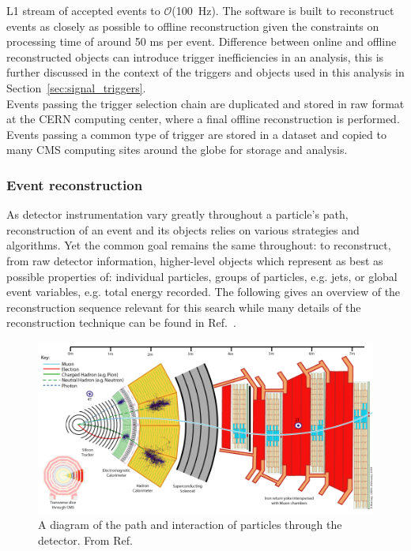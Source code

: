 L1 stream of accepted events to $\mathcal{O}$(100~Hz). The software is built to reconstruct
events as closely as possible to offline reconstruction given the constraints on processing time
of around 50 ms per event. Difference between online and offline reconstructed objects can 
introduce trigger inefficiencies in an analysis, this is further discussed in the 
context of the triggers and objects used in this analysis in Section~\ref{sec:signal_triggers}.\\
\indent Events passing the trigger selection chain are duplicated and stored in raw format at
the CERN computing center, where a final offline reconstruction is performed. Events passing
a common type of trigger are stored in a dataset and copied to many CMS computing sites around the
globe for storage and analysis. 
  
\subsubsection{Event reconstruction\label{sec:eventReco}}

As detector instrumentation vary greatly throughout a particle's path, reconstruction
of an event and its objects relies on various strategies and algorithms. Yet the common goal 
remains the same throughout: to reconstruct, from raw detector information,
higher-level objects which represent as best as possible properties of: individual
particles, groups of particles, e.g. jets, or global event variables, e.g. total energy
recorded. The following gives an overview of the reconstruction sequence relevant for this search
while many details of the reconstruction technique can be found in Ref.~\cite{Bayatian:922757,Bayatian:942733}. 

\begin{figure}[h!]
  \begin{center}
      \includegraphics[width=.9\textwidth,]{figures/CMS_Slice}
      \caption{\label{fig:cmsSlice}
      A diagram of the path and interaction of particles through the detector. From Ref.~\cite{cmsSlice}}
  \end{center}
\end{figure}

